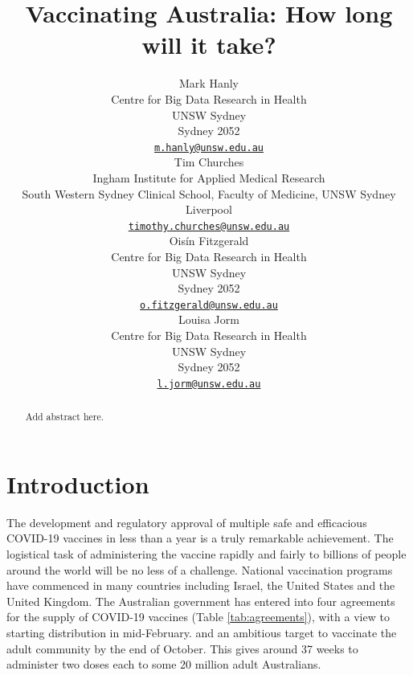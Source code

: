 \documentclass{article}
\title{Vaccinating Australia: How long will it take?}
\author{
    Mark Hanly
   \\
    Centre for Big Data Research in Health \\
    UNSW Sydney \\
  Sydney 2052 \\
  \texttt{\href{mailto:m.hanly@unsw.edu.au}{\nolinkurl{m.hanly@unsw.edu.au}}} \\
   \And
    Tim Churches
   \\
    Ingham Institute for Applied Medical Research \\
    South Western Sydney Clinical School, Faculty of Medicine, UNSW Sydney \\
  Liverpool \\
  \texttt{\href{mailto:timothy.churches@unsw.edu.au}{\nolinkurl{timothy.churches@unsw.edu.au}}} \\
   \And
    Oisín Fitzgerald
   \\
    Centre for Big Data Research in Health \\
    UNSW Sydney \\
  Sydney 2052 \\
  \texttt{\href{mailto:o.fitzgerald@unsw.edu.au}{\nolinkurl{o.fitzgerald@unsw.edu.au}}} \\
   \And
    Louisa Jorm
   \\
    Centre for Big Data Research in Health \\
    UNSW Sydney \\
  Sydney 2052 \\
  \texttt{\href{mailto:l.jorm@unsw.edu.au}{\nolinkurl{l.jorm@unsw.edu.au}}} \\
  }
\begin{document}
\maketitle

\def\tightlist{}


\begin{abstract}
Add abstract here.
\end{abstract}


\newpage

\hypertarget{introduction}{%
\section{Introduction}\label{introduction}}

The development and regulatory approval of multiple safe and efficacious
COVID-19 vaccines in less than a year is a truly remarkable achievement.
The logistical task of administering the vaccine rapidly and fairly to
billions of people around the world will be no less of a challenge.
National vaccination programs have commenced in many countries including
Israel, the United States and the United Kingdom. The Australian
government has entered into four agreements for the supply of COVID-19
vaccines (Table \ref{tab:agreements}), with a view to starting
distribution in mid-February. and an ambitious target to vaccinate the
adult community by the end of October. This gives around 37 weeks to
administer two doses each to some 20 million adult Australians.
\end{document}

